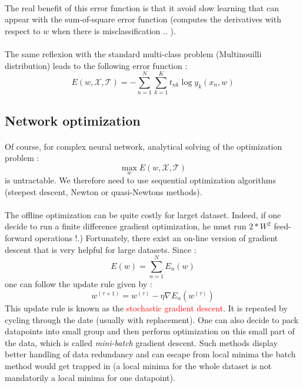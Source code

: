 \documentclass[a4paper]{article}
\begin{document}
{{{				\paragraph{} The real benefit of this error function is that it avoid slow learning that can appear with the sum-of-square error function (computes the derivatives with respect to $w$ when there is misclassification .. ). 
				
				\paragraph{} The same reflexion with the standard multi-class problem (Multinouilli distribution) leads to the following error function : 
				\begin{equation}
					E(w,\mathcal{X},\mathcal{T}) = -\sum_{n=1}^N \sum_{k=1}^K t_{nk}\log{y_k(x_n,w)}
				\end{equation}
			}
		}
		\subsection{Network optimization}
		{
			\paragraph{} Of course, for complex neural network, analytical solving of the optimization problem : 
			\begin{equation}
				\max_w E(w,\mathcal{X},\mathcal{T})
			\end{equation}
			is untractable. We therefore need to use sequential optimization algorithms (steepest descent, Newton or quasi-Newtons methods). 
			
			\paragraph{} The offline optimization can be quite costly for larget dataset. Indeed, if one decide to run a finite difference gradient optimization, he must run $2*W^2$ feed-forward operations !.) Fortunately, there exist an on-line version of gradient descent that is very helpful for large datasets. Since : 
			\begin{equation}
				E(w) = \sum_{n=1}^N E_n(w) 
			\end{equation}
			one can follow the update rule given by : 
			\begin{equation}
				w^{(\tau+1)} = w^{(\tau)} - \eta \nabla E_n(w^{(\tau)})
			\end{equation}
			This update rule is known as the \textcolor{red}{stochastic gradient descent}. It is repeated by cycling through the date (usually with replacement). One can also decide to pack datapoints into small group and then perform optimization on this small part of the data, which is called \emph{mini-batch} gradient descent. Such methods display better handling of data redundancy and can escape from local minima the batch method would get trapped in (a local minima for the whole dataset is not mandatorily a local minima for one datapoint). 
		}
	}
	
\end{document}
